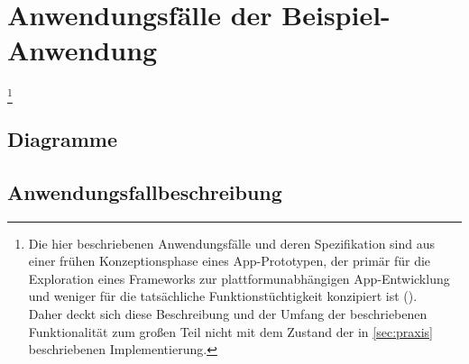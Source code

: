 
\chapter{Anwendungsfälle der Beispiel-Anwendung}\footnote{Die hier beschriebenen Anwendungsfälle und deren Spezifikation sind aus einer frühen Konzeptionsphase eines App-Prototypen, der primär für die Exploration eines Frameworks zur plattformunabhängigen App-Entwicklung und weniger für die tatsächliche Funktionstüchtigkeit konzipiert ist ().\\
Daher deckt sich diese Beschreibung und der Umfang der beschriebenen Funktionalität zum großen Teil nicht mit dem Zustand der in \autoref{sec:praxis} beschriebenen Implementierung.}

\section{Diagramme}


\pagebreak
{}

\restoregeometry
\pagebreak

\section{Anwendungsfallbeschreibung}

	\label{manageLists}

